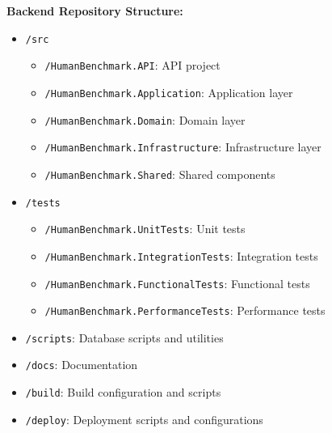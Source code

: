 \textbf{Backend Repository Structure:}
\begin{itemize}
    \item \texttt{/src}
    \begin{itemize}
        \item \texttt{/HumanBenchmark.API}: API project
        \item \texttt{/HumanBenchmark.Application}: Application layer
        \item \texttt{/HumanBenchmark.Domain}: Domain layer
        \item \texttt{/HumanBenchmark.Infrastructure}: Infrastructure layer
        \item \texttt{/HumanBenchmark.Shared}: Shared components
    \end{itemize}
    \item \texttt{/tests}
    \begin{itemize}
        \item \texttt{/HumanBenchmark.UnitTests}: Unit tests
        \item \texttt{/HumanBenchmark.IntegrationTests}: Integration tests
        \item \texttt{/HumanBenchmark.FunctionalTests}: Functional tests
        \item \texttt{/HumanBenchmark.PerformanceTests}: Performance tests
    \end{itemize}
    \item \texttt{/scripts}: Database scripts and utilities
    \item \texttt{/docs}: Documentation
    \item \texttt{/build}: Build configuration and scripts
    \item \texttt{/deploy}: Deployment scripts and configurations
\end{itemize}


